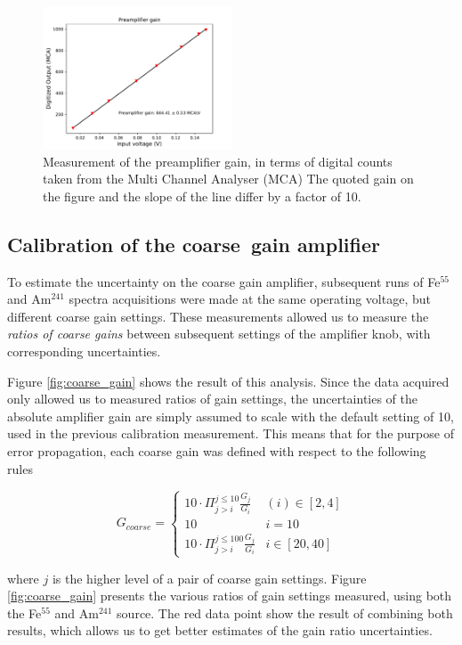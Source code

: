 \begin{figure}[htb!]
  \includegraphics[scale=0.5,width=0.5\textwidth]{graphics/preamp_gain_calibration_plus_conversionfactor.pdf}
  \caption{Measurement of the preamplifier gain, in terms of digital counts taken from the Multi Channel Analyser (MCA) The quoted gain on the figure and the slope of the line differ by a factor of 10.}
  \label{fig:preamp_gain_mca}
\end{figure}


\subsection{Calibration of the coarse~gain amplifier}
\label{sec:coarse}
To estimate the uncertainty on the coarse gain amplifier, subsequent runs of Fe$^{55}$ and Am$^{241}$ spectra acquisitions were made at the same operating voltage, but different coarse gain settings. These measurements allowed us to measure the \textit{ratios of coarse gains} between subsequent settings of the amplifier knob, with corresponding uncertainties.

Figure \ref{fig:coarse_gain} shows the result of this analysis. Since the data acquired only allowed us to measured ratios of gain settings, the uncertainties of the absolute amplifier gain are simply assumed to scale with the default setting of 10, used in the previous calibration measurement. This means that for the purpose of error propagation, each coarse gain was defined with respect to the following rules

$$
G_{coarse} = \left\{
\begin{array}{ll} 
  10\cdot\Pi_{j>i}^{j\leq10}\frac{G_{j}}{G_{i}} & (i) \in [2,4] \\
  10 & i=10 \\
  10\cdot\Pi_{j>i}^{j\leq 100}\frac{G_{j}}{G_{i}} & i \in [20,40] 
\end{array}
\right.
$$

where $j$ is the higher level of a pair of coarse gain settings. Figure \ref{fig:coarse_gain} presents the various ratios of gain settings measured, using both the Fe$^{55}$ and Am$^{241}$ source. The red data point show the result of combining both results, which allows us to get better estimates of the gain ratio uncertainties.

